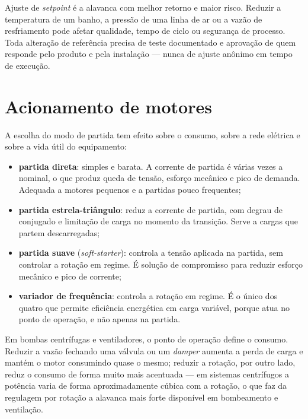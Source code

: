 \begin{atencao}
Ajuste de \emph{setpoint} é a alavanca com melhor retorno e maior risco. Reduzir a temperatura de um
banho, a pressão de uma linha de ar ou a vazão de resfriamento pode afetar qualidade, tempo de ciclo
ou segurança de processo. Toda alteração de referência precisa de teste documentado e aprovação de
quem responde pelo produto e pela instalação --- nunca de ajuste anônimo em tempo de execução.
\end{atencao}

\section{Acionamento de motores}

A escolha do modo de partida tem efeito sobre o consumo, sobre a rede elétrica e sobre a vida útil do
equipamento:

\begin{itemize}
  \item \textbf{partida direta}: simples e barata. A corrente de partida é várias vezes a nominal, o
        que produz queda de tensão, esforço mecânico e pico de demanda. Adequada a motores pequenos e
        a partidas pouco frequentes;
  \item \textbf{partida estrela-triângulo}: reduz a corrente de partida, com degrau de conjugado e
        limitação de carga no momento da transição. Serve a cargas que partem descarregadas;
  \item \textbf{partida suave} (\emph{soft-starter}): controla a tensão aplicada na partida, sem
        controlar a rotação em regime. É solução de compromisso para reduzir esforço mecânico e pico
        de corrente;
  \item \textbf{variador de frequência}: controla a rotação em regime. É o único dos quatro que
        permite eficiência energética em carga variável, porque atua no ponto de operação, e não
        apenas na partida.
\end{itemize}

Em bombas centrífugas e ventiladores, o ponto de operação define o consumo. Reduzir a vazão fechando
uma válvula ou um \emph{damper} aumenta a perda de carga e mantém o motor consumindo quase o mesmo;
reduzir a rotação, por outro lado, reduz o consumo de forma muito mais acentuada --- em sistemas
centrífugos a potência varia de forma aproximadamente cúbica com a rotação, o que faz da
regulagem por rotação a alavanca mais forte disponível em bombeamento e ventilação.

